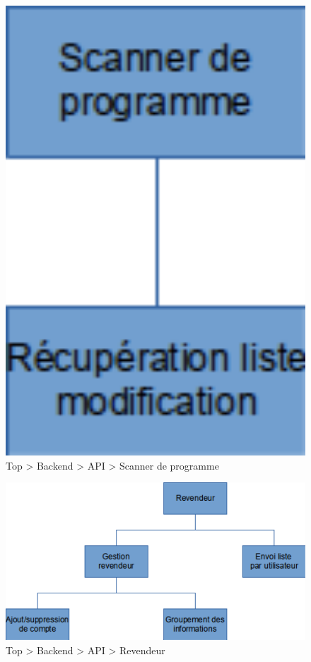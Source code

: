 \begin{figure}[H]
  \vspace*{2cm}
  \caption{Top \textgreater{} Backend \textgreater{} API \textgreater{} Scanner de programme}
  \centering
  \vspace*{0.5cm}
  \includegraphics[max width=18cm]{wbs3_backend_api_scanner.png}
\end{figure}

\begin{figure}[H]
  \vspace*{2cm}
  \caption{Top \textgreater{} Backend \textgreater{} API \textgreater{} Revendeur}
  \centering
  \vspace*{0.5cm}
  \includegraphics[max width=18cm]{wbs3_backend_api_revendeur.png}
\end{figure}

